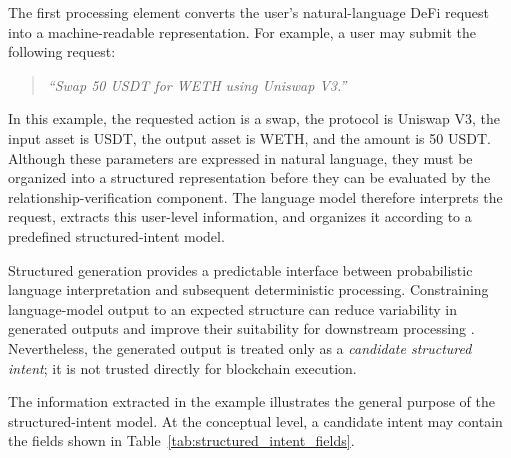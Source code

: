 The first processing element converts the user's natural-language DeFi request
into a machine-readable representation. For example, a user may submit the
following request:

\begin{quote}
\textit{``Swap 50 USDT for WETH using Uniswap V3.''}
\end{quote}

In this example, the requested action is a swap, the protocol is Uniswap V3,
the input asset is USDT, the output asset is WETH, and the amount is 50 USDT.
Although these parameters are expressed in natural language, they must be
organized into a structured representation before they can be evaluated by
the relationship-verification component. The language model therefore
interprets the request, extracts this user-level information, and organizes
it according to a predefined structured-intent model.

Structured generation provides a predictable interface between probabilistic
language interpretation and subsequent deterministic processing. Constraining
language-model output to an expected structure can reduce variability in
generated outputs and improve their suitability for downstream processing
\cite{geng2023grammar}. Nevertheless, the generated output is treated only as
a \textit{candidate structured intent}; it is not trusted directly for
blockchain execution.

The information extracted in the example illustrates the general purpose of
the structured-intent model. At the conceptual level, a candidate intent may
contain the fields shown in Table~\ref{tab:structured_intent_fields}.





